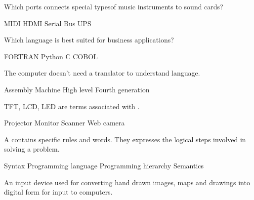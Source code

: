 \documentclass[a4paper]{exam}
\begin{document}
\begin{center}
\end{center}

\vspace{5mm}

\vspace{5mm}

\begin{questions}
\question Which ports connects special typesof music instruments to sound cards?

\begin{oneparchoices}
    \choice MIDI
    \choice HDMI
    \choice Serial Bus
    \choice UPS
\end{oneparchoices}

\question Which language is best suited for business applications?

\begin{oneparchoices}
    \choice FORTRAN
    \choice Python
    \choice C
    \choice COBOL
\end{oneparchoices}

\question The computer doesn't need a translator to understand \fillin[100] language.

\begin{oneparchoices}
    \choice Assembly
    \choice Machine
    \choice High level
    \choice Fourth generation
\end{oneparchoices}

\question TFT, LCD, LED are terms associated with \fillin[100].

\begin{oneparchoices}
    \choice Projector
    \choice Monitor
    \choice Scanner
    \choice Web camera
\end{oneparchoices}

\question A \fillin[100] contains specific rules and words. They expresses the logical steps involved in solving a problem.

\begin{oneparchoices}
    \choice Syntax
    \choice Programming language
    \choice Programming hierarchy
    \choice Semantics
\end{oneparchoices}

\question An input device used for converting hand drawn images, maps and drawings into digital form for input to computers.


\end{questions}
\end{document}
